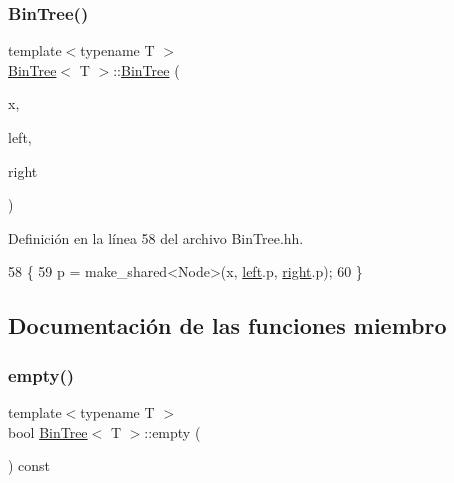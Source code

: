 \subsubsection{\texorpdfstring{Bin\+Tree()}{BinTree()}\hspace{0.1cm}{\footnotesize\ttfamily [3/3]}}
{\footnotesize\ttfamily template$<$typename T $>$ \\
\mbox{\hyperlink{class_bin_tree}{Bin\+Tree}}$<$ T $>$\+::\mbox{\hyperlink{class_bin_tree}{Bin\+Tree}} (\begin{DoxyParamCaption}\item[{const T \&}]{x,  }\item[{const \mbox{\hyperlink{class_bin_tree}{Bin\+Tree}}$<$ T $>$ \&}]{left,  }\item[{const \mbox{\hyperlink{class_bin_tree}{Bin\+Tree}}$<$ T $>$ \&}]{right }\end{DoxyParamCaption})\hspace{0.3cm}{\ttfamily [explicit]}}



Definición en la línea 58 del archivo Bin\+Tree.\+hh.


\begin{DoxyCode}
58                                                                              \{
59         p = make\_shared<Node>(x, \mbox{\hyperlink{class_bin_tree_a82108db4c1b08d1f111027788c196d4e}{left}}.p, \mbox{\hyperlink{class_bin_tree_aff8e96651b27284c329667b5ad3e4d0b}{right}}.p);
60     \}
\end{DoxyCode}


\subsection{Documentación de las funciones miembro}
\mbox{\label{class_bin_tree_a74cda259ba5c25b8ee38ed4dc33e4fad}} 
\subsubsection{\texorpdfstring{empty()}{empty()}}
{\footnotesize\ttfamily template$<$typename T $>$ \\
bool \mbox{\hyperlink{class_bin_tree}{Bin\+Tree}}$<$ T $>$\+::empty (\begin{DoxyParamCaption}{ }\end{DoxyParamCaption}) const}



